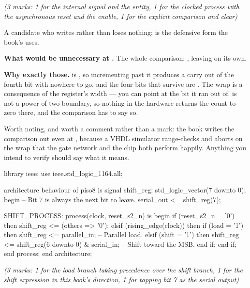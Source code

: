 {\itshape (3 marks: 1 for the internal signal and the entity, 1 for the clocked process with the
asynchronous reset and the enable, 1 for the explicit comparison and clear)\par}

\medskip
A candidate who writes  rather than \code{>=} loses nothing; \code{>=} is the
defensive form the book's  uses.

\textbf{What would be unnecessary at .} The whole comparison:
, leaving
 on its own.

\textbf{Why exactly those.}  is , so incrementing past it produces a carry
out of the fourth bit with nowhere to go, and the four bits that survive are . The wrap
is a consequence of the register's width --- you can point at the bit it ran out of.  is
not a power-of-two boundary, so nothing in the hardware returns the count to zero there, and the
comparison has to say so.

Worth noting, and worth a comment rather than a mark: the book writes the comparison out even at
, because a VHDL simulator range-checks  and aborts on the
wrap that the gate network and the chip both perform happily. Anything you intend to verify should
say what it means. 

\begin{vhdlcode}
library ieee;
use ieee.std_logic_1164.all;

architecture behaviour of piso8 is
signal shift_reg: std_logic_vector(7 downto 0);
begin
    -- Bit 7 is always the next bit to leave.
    serial_out <= shift_reg(7);

    SHIFT_PROCESS: process(clock, reset_s2_n) is
    begin
        if (reset_s2_n = '0') then
            shift_reg <= (others => '0');
        elsif (rising_edge(clock)) then
            if (load = '1') then
                shift_reg <= parallel_in;                  -- Parallel load.
            elsif (shift = '1') then
                shift_reg <= shift_reg(6 downto 0) & serial_in;  -- Shift toward the MSB.
            end if;
        end if;
    end process;
end architecture;
\end{vhdlcode}

{\itshape (3 marks: 1 for the load branch taking precedence over the shift branch, 1 for the shift
expression in this book's direction, 1 for tapping bit 7 as the serial output)\par}


